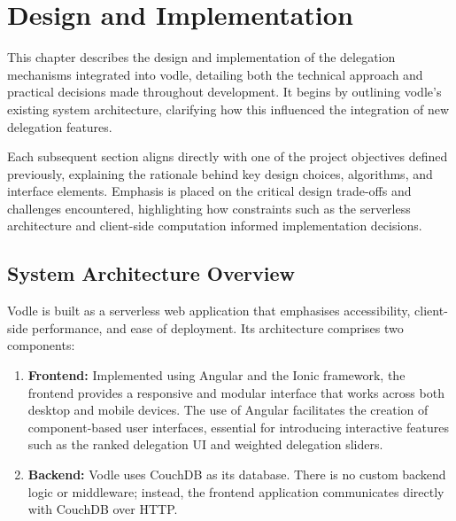 \chapter{Design and Implementation}
\label{ch:design_implementation}
This chapter describes the design and implementation of the delegation mechanisms integrated into vodle, detailing both the technical approach and practical decisions made throughout development. It begins by outlining vodle's existing system architecture, clarifying how this influenced the integration of new delegation features. 

Each subsequent section aligns directly with one of the project objectives defined previously, explaining the rationale behind key design choices, algorithms, and interface elements. Emphasis is placed on the critical design trade-offs and challenges encountered, highlighting how constraints such as the serverless architecture and client-side computation informed implementation decisions.

\section{System Architecture Overview}\label{sec:design_architecture}
Vodle is built as a serverless web application that emphasises accessibility, client-side performance, and ease of deployment. Its architecture comprises two components:

\begin{enumerate}
  \item \textbf{Frontend:} Implemented using Angular and the Ionic framework, the frontend provides a responsive and modular interface that works across both desktop and mobile devices. The use of Angular facilitates the creation of component-based user interfaces, essential for introducing interactive features such as the ranked delegation UI and weighted delegation sliders.
  \item \textbf{Backend:} Vodle uses CouchDB as its database. There is no custom backend logic or middleware; instead, the frontend application communicates directly with CouchDB over HTTP.
\end{enumerate}

